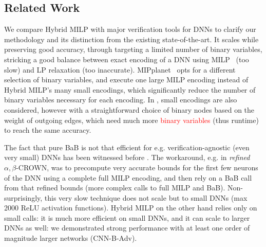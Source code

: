 \subsection{Related Work} 

We compare Hybrid MILP with major verification tools for DNNs to clarify our methodology and its distinction from the existing state-of-the-art. It scales while preserving good accuracy, through targeting a limited number of binary variables, stricking a good balance between exact encoding of a DNN using MILP~\cite{MILP} (too slow) and LP relaxation (too inaccurate). MIPplanet~\cite{MIPplanet} opts for a different selection of binary variables, and execute one large MILP encoding instead of Hybrid MILP's many small encodings, which significantly reduce the number of binary variables necessary for each encoding. In \cite{DivideAndSlide}, small encodings are also considered, however with a straightforward choice of binary nodes based on the weight of outgoing edges, which need much more \textcolor{red}{binary variables} (thus runtime) to reach the same accuracy.

The fact that pure BaB is not that efficient for e.g. verification-agnostic (even very small) DNNs has been witnessed before \cite{MILP2}. The workaround, e.g. in {\em refined} $\alpha,\beta$-CROWN, was to precompute very accurate bounds for the first few neurons of the DNN using a complete full MILP encoding, and then rely on a BaB call from that refined bounds (more complex calls to full MILP and BaB). Non-surprisingly, this very slow technique does not scale but to small DNNs (max 2000 ReLU activation functions). Hybrid MILP on the other hand relies only on small calls: it is much more efficient on small DNNs, and it can scale to larger DNNs as well: we demonstrated strong performance with at least one order of magnitude larger networks (CNN-B-Adv).



